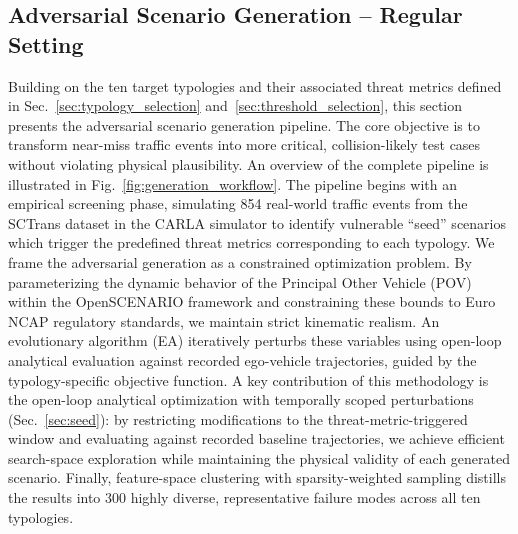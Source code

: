 
\subsection{Adversarial Scenario Generation -- Regular Setting}\label{sec:generation}
Building on the ten target typologies and their associated threat metrics defined in Sec.~\ref{sec:typology_selection} and~\ref{sec:threshold_selection}, this section presents the adversarial scenario generation pipeline. The core objective is to transform near-miss traffic events into more critical, collision-likely test cases without violating physical plausibility. An overview of the complete pipeline is illustrated in Fig.~\ref{fig:generation_workflow}. The pipeline begins with an empirical screening phase, simulating 854 real-world traffic events from the SCTrans dataset in the CARLA simulator to identify vulnerable ``seed'' scenarios which trigger the predefined threat metrics corresponding to each typology. We frame the adversarial generation as a constrained optimization problem. By parameterizing the dynamic behavior of the Principal Other Vehicle (POV) within the OpenSCENARIO framework and constraining these bounds to Euro NCAP regulatory standards, we maintain strict kinematic realism. An evolutionary algorithm (EA) iteratively perturbs these variables using open-loop analytical evaluation against recorded ego-vehicle trajectories, guided by the typology-specific objective function. A key contribution of this methodology is the open-loop analytical optimization with temporally scoped perturbations (Sec.~\ref{sec:seed}): by restricting modifications to the threat-metric-triggered window and evaluating against recorded baseline trajectories, we achieve efficient search-space exploration while maintaining the physical validity of each generated scenario. Finally, feature-space clustering with sparsity-weighted sampling distills the results into 300 highly diverse, representative failure modes across all ten typologies.

